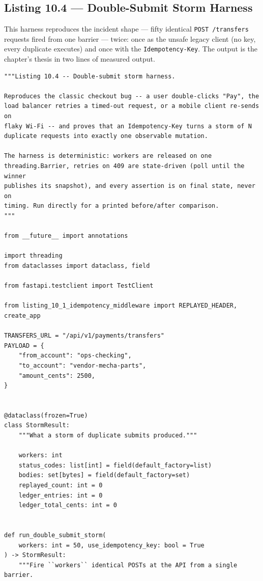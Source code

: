 \subsection{Listing 10.4 --- Double-Submit Storm Harness}
\label{sec:ch10-listing4}

This harness reproduces the incident shape --- fifty identical
\texttt{POST /transfers} requests fired from one barrier --- twice: once as
the unsafe legacy client (no key, every duplicate executes) and once with
the \texttt{Idempotency-Key}. The output is the chapter's thesis in two
lines of measured output.

\begin{verbatim}
"""Listing 10.4 -- Double-submit storm harness.

Reproduces the classic checkout bug -- a user double-clicks "Pay", the
load balancer retries a timed-out request, or a mobile client re-sends on
flaky Wi-Fi -- and proves that an Idempotency-Key turns a storm of N
duplicate requests into exactly one observable mutation.

The harness is deterministic: workers are released on one
threading.Barrier, retries on 409 are state-driven (poll until the winner
publishes its snapshot), and every assertion is on final state, never on
timing. Run directly for a printed before/after comparison.
"""

from __future__ import annotations

import threading
from dataclasses import dataclass, field

from fastapi.testclient import TestClient

from listing_10_1_idempotency_middleware import REPLAYED_HEADER, create_app

TRANSFERS_URL = "/api/v1/payments/transfers"
PAYLOAD = {
    "from_account": "ops-checking",
    "to_account": "vendor-mecha-parts",
    "amount_cents": 2500,
}


@dataclass(frozen=True)
class StormResult:
    """What a storm of duplicate submits produced."""

    workers: int
    status_codes: list[int] = field(default_factory=list)
    bodies: set[bytes] = field(default_factory=set)
    replayed_count: int = 0
    ledger_entries: int = 0
    ledger_total_cents: int = 0


def run_double_submit_storm(
    workers: int = 50, use_idempotency_key: bool = True
) -> StormResult:
    """Fire ``workers`` identical POSTs at the API from a single barrier.


\end{verbatim}

